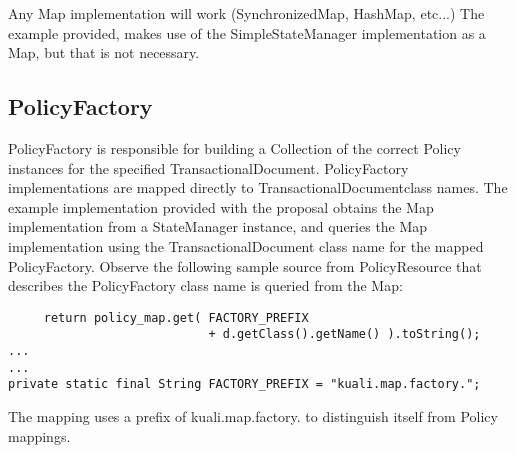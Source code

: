 \documentclass[12pt]{article}
\begin{document}
  Any \sf Map \rm implementation will work (\sf SynchronizedMap\rm,
 \sf HashMap\rm, etc...) The example provided, makes use of the
 \sf SimpleStateManager \rm implementation as a \sf Map\rm, but that is not
necessary.
  \subsection{PolicyFactory}
  \sf PolicyFactory \rm is responsible for building a \sf Collection \rm
of the correct \sf Policy \rm instances for the specified 
\sf TransactionalDocument\rm. \sf PolicyFactory \rm implementations are 
mapped directly to \sf TransactionalDocument\rm class names. The example
 implementation provided with the proposal obtains the \sf Map \rm 
implementation from a \sf StateManager \rm instance, and queries the 
\sf Map \rm implementation using the \sf TransactionalDocument \rm class
name for the mapped \sf PolicyFactory\rm. Observe the following sample
source from \sf PolicyResource \rm that describes the \sf PolicyFactory \rm
class name is queried from the \sf Map\rm:
  \sf \begin{verbatim}
     return policy_map.get( FACTORY_PREFIX
                            + d.getClass().getName() ).toString();
...
...
private static final String FACTORY_PREFIX = "kuali.map.factory.";
  \end{verbatim} \rm

  The mapping uses a prefix of \sf kuali.map.factory. \rm to distinguish 
itself from \sf Policy \rm mappings.
\end{document}
